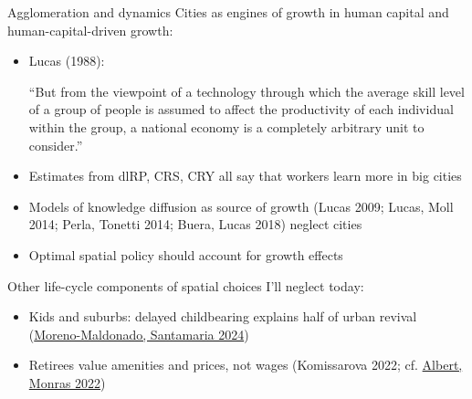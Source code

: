 \documentclass[11pt,notes=hide,aspectratio=169]{beamer}
\begin{document}
\begin{frame}{Agglomeration and dynamics}
Cities as engines of growth in human capital and human-capital-driven growth:
\begin{itemize}
\item Lucas (1988): {\small ``But from the viewpoint of a technology through which the average skill level of a group of people is assumed to affect the productivity of each individual within the group, a national economy is a completely arbitrary unit to consider.''\par}
\item Estimates from dlRP, CRS, CRY all say that workers learn more in big cities
\item Models of knowledge diffusion as source of growth (Lucas 2009; Lucas, Moll 2014; Perla, Tonetti 2014; Buera, Lucas 2018) neglect cities
\item Optimal spatial policy should account for growth effects
\end{itemize}
\medskip
{\footnotesize Other life-cycle components of spatial choices I'll neglect today:
\begin{itemize}
\item {Kids and suburbs: delayed childbearing explains half of urban revival (\href{https://sites.google.com/view/clarasantamaria/research}{Moreno-Maldonado, Santamaria 2024})\par}
\item Retirees value amenities and prices, not wages (Komissarova 2022; cf. \href{https://www.aeaweb.org/articles?id=10.1257/aer.20211241}{Albert, Monras 2022})
\end{itemize}
\par}
\end{frame}
\newcommand{\R}{\mathbb{R}}
\end{document}

